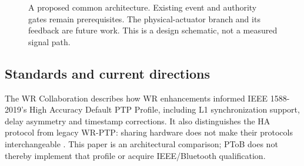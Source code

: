 \documentclass[11pt,letterpaper]{article}
\begin{document}
\begin{figure}[htbp]
\centering
{}
\caption{A proposed common architecture. Existing event and authority gates remain prerequisites. The physical-actuator branch and its feedback are future work. This is a design schematic, not a measured signal path.}
\end{figure}

\subsection{Standards and current directions}
The WR Collaboration describes how WR enhancements informed IEEE 1588-2019's High Accuracy Default PTP Profile, including L1 synchronization support, delay asymmetry and timestamp corrections. It also distinguishes the HA protocol from legacy WR-PTP: sharing hardware does not make their protocols interchangeable \cite{ha}. This paper is an architectural comparison; PToB does not thereby implement that profile or acquire IEEE/Bluetooth qualification.
\end{document}
